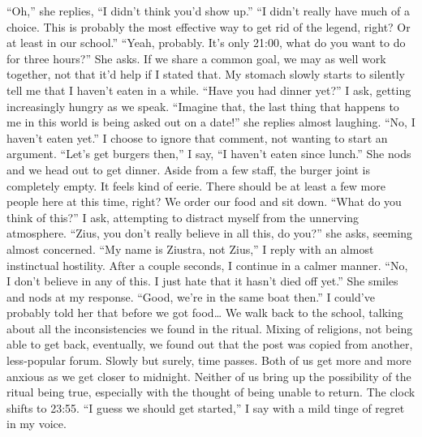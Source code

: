 \documentclass[a4paper, 12pt]{book}
\newcommand\tab[1][1cm]{\hspace*{#1}}
\begin{document}
\newline
\tab
“Oh,” she replies, “I didn’t think you’d show up.”
\newline
\tab
“I didn’t really have much of a choice. This is probably the most effective way to get rid of the legend, right? Or at least in our school.”
\newline
\tab
“Yeah, probably. It’s only 21:00, what do you want to do for three hours?” She asks. If we share a common goal, we may as well work together, not that it’d help if I stated that. My stomach slowly starts to silently tell me that I haven’t eaten in a while.
\newline
\tab
“Have you had dinner yet?” I ask, getting increasingly hungry as we speak.
\newline
\tab
“Imagine that, the last thing that happens to me in this world is being asked out on a date!” she replies almost laughing. “No, I haven’t eaten yet.” 
\newline
\tab
I choose to ignore that comment, not wanting to start an argument. “Let’s get burgers then,” I say, “I haven’t eaten since lunch.” She nods and we head out to get dinner. Aside from a few staff, the burger joint is completely empty. It feels kind of eerie. There should be at least a few more people here at this time, right? We order our food and sit down. “What do you think of this?” I ask, attempting to distract myself from the unnerving atmosphere.
\newline
\tab
“Zius, you don’t really believe in all this, do you?” she asks, seeming almost concerned.
\newline
\tab
“My name is Ziustra, not Zius,” I reply with an almost instinctual hostility. After a couple seconds, I continue in a calmer manner. “No, I don’t believe in any of this. I just hate that it hasn’t died off yet.”
\newline
\tab
She smiles and nods at my response. “Good, we’re in the same boat then.” I could’ve probably told her that before we got food…
\newline
\tab
We walk back to the school, talking about all the inconsistencies we found in the ritual. Mixing of religions, not being able to get back, eventually, we found out that the post was copied from another, less-popular forum. Slowly but surely, time passes. Both of us get more and more anxious as we get closer to midnight. Neither of us bring up the possibility of the ritual being true, especially with the thought of being unable to return. The clock shifts to 23:55. “I guess we should get started,” I say with a mild tinge of regret in my voice.
\end{document}
